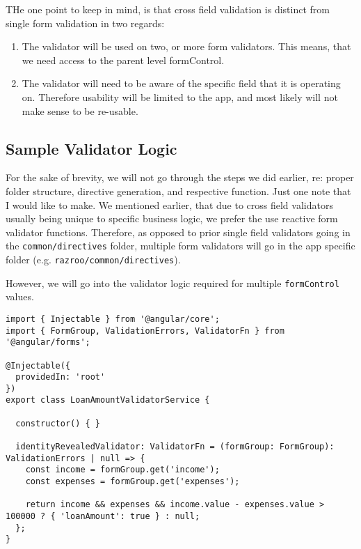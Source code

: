 THe one point to keep in mind, is that cross field validation is distinct 
from single form validation in two regards: 
\begin{enumerate}
  \item The validator will be used on two, or more form validators. This 
  means, that we need access to the parent level formControl.
  \item The validator will need to be aware of the specific field that it is
  operating on. Therefore usability will be limited to the app, and most likely
  will not make sense to be re-usable. 
\end{enumerate}


\subsection{Sample Validator Logic}
For the sake of brevity, we will not go through the steps we did earlier, re: 
proper folder structure, directive generation, and respective function. Just one 
note that I would like to make. We mentioned earlier, that due to cross field 
validators usually being unique to specific business logic, we prefer the use 
reactive form validator functions. Therefore, as opposed to prior single field 
validators going in the \lstinline{common/directives} folder, multiple form 
validators will go in the app specific folder (e.g. \lstinline{razroo/common/directives}).

However, we will go into the validator logic required for multiple \lstinline{formControl} 
values. 

\begin{lstlisting}[caption=loan-amount-validator.ts]
import { Injectable } from '@angular/core';
import { FormGroup, ValidationErrors, ValidatorFn } from '@angular/forms';

@Injectable({
  providedIn: 'root'
})
export class LoanAmountValidatorService {

  constructor() { }

  identityRevealedValidator: ValidatorFn = (formGroup: FormGroup): ValidationErrors | null => {
    const income = formGroup.get('income');
    const expenses = formGroup.get('expenses');

    return income && expenses && income.value - expenses.value > 100000 ? { 'loanAmount': true } : null;
  };
}  
\end{lstlisting}

